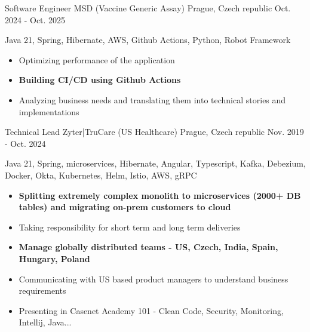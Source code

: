 

\begin{cventries}

    \cventry
    {Software Engineer} %
    {MSD (Vaccine Generic Assay)} %
    {Prague, Czech republic} %
    {Oct. 2024 - Oct. 2025} %
    {
        \hspace{15pt} \faHammer Java 21, Spring, Hibernate, AWS, Github Actions, Python, Robot Framework
        \begin{itemize}
            \item {Optimizing performance of the application}
            \item {\textbf{Building CI/CD using Github Actions}}
            \item {Analyzing business needs and translating them into technical stories and implementations}
        \end{itemize}
    }
    \cventry
    {Technical Lead} %
    {Zyter|TruCare (US Healthcare)} %
    {Prague, Czech republic} %
    {Nov. 2019 - Oct. 2024} %
    {
        \hspace{15pt} \faHammer Java 21, Spring, microservices, Hibernate, Angular, Typescript, Kafka, Debezium, Docker, Okta, Kubernetes, Helm, Istio, AWS, gRPC
        \begin{itemize}
            \item {\textbf{Splitting extremely complex monolith to microservices (2000+ DB tables) and migrating on-prem customers to cloud}}
            \item {Taking responsibility for short term and long term deliveries}
            \item {\textbf{Manage globally distributed teams - US, Czech, India, Spain, Hungary, Poland}}
            \item {Communicating with US based product managers to understand business requirements}
            \item {Presenting in Casenet Academy 101 - Clean Code, Security, Monitoring, Intellij, Java...}
        \end{itemize}
    }


\end{cventries}

